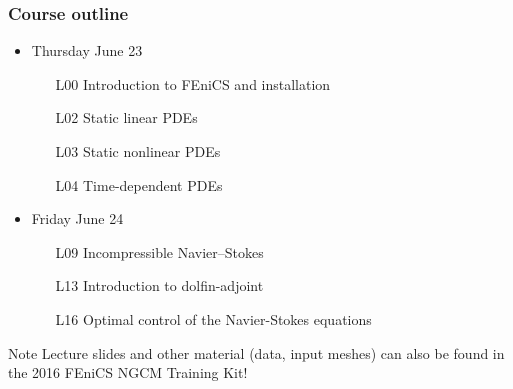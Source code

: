 \documentclass{fenicscourse}
\begin{document}

\begin{frame}
  \frametitle{Course outline}


  \begin{itemize}
  \item
    Thursday June 23
    \begin{enumerate}
    \item[L00]
      Introduction to FEniCS and installation
    \item[L02]
      Static linear PDEs
    \item[L03]
      Static nonlinear PDEs
    \item[L04]
      Time-dependent PDEs
    \end{enumerate}

  \item
    Friday June 24
    \begin{enumerate}
    \item[L09]
      Incompressible Navier--Stokes
    \item[L13]
      Introduction to dolfin-adjoint
    \item[L16]
      Optimal control of the Navier-Stokes equations
    \end{enumerate}

  \end{itemize}

  \normalsize

  \bigskip

  \begin{block}{Note}
    Lecture slides and other material (data, input meshes) can also be
    found in the 2016 FEniCS NGCM Training Kit!
  \end{block}

\end{frame}



\end{document}
